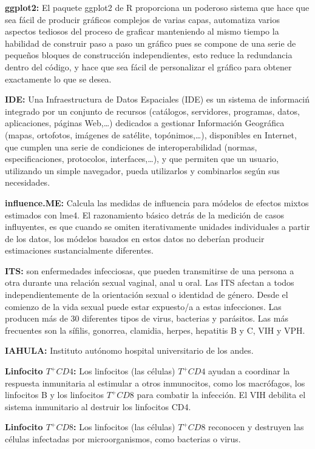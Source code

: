 \textbf{ggplot2:} El paquete ggplot2 de R proporciona un poderoso sistema que hace que sea f\'acil de producir gr\'aficos complejos de varias capas, automatiza varios aspectos tediosos del proceso de graficar manteniendo al mismo tiempo la habilidad de construir paso a paso un gr\'afico pues se compone de una serie de pequeños bloques de construcci\'on independientes, esto reduce la redundancia dentro del c\'odigo, y hace que sea f\'acil de personalizar el gr\'afico para obtener exactamente lo que se desea.

\textbf{IDE: } Una Infraestructura de Datos Espaciales (IDE) es un sistema de informaci\'n integrado por un conjunto de recursos (cat\'alogos, servidores, programas, datos, aplicaciones, p\'aginas Web,…) dedicados a gestionar Informaci\'on Geogr\'afica (mapas, ortofotos, im\'agenes de sat\'elite, top\'onimos,…), disponibles en Internet, que cumplen una serie de condiciones de interoperabilidad (normas, especificaciones, protocolos, interfaces,…), y que permiten que un usuario, utilizando un simple navegador, pueda utilizarlos y combinarlos seg\'un sus necesidades.

\textbf{influence.ME: } Calcula las medidas de influencia para m\'odelos de efectos mixtos estimados con lme4. El razonamiento b\'asico detr\'as de la medici\'on de casos influyentes, es que cuando se omiten iterativamente unidades individuales
a partir de los datos, los m\'odelos basados en estos datos no deber\'ian producir estimaciones sustancialmente diferentes. 

\textbf{ITS: } son enfermedades infecciosas, que pueden transmitirse de una persona a otra durante una relaci\'on sexual vaginal, anal u oral. Las ITS afectan a todos independientemente de la orientaci\'on sexual o identidad de g\'enero. Desde el comienzo de la vida sexual puede estar expuesto/a a estas infecciones. Las producen m\'as de 30 diferentes tipos de virus, bacterias y par\'asitos. Las m\'as frecuentes son la s\'ifilis, gonorrea, clamidia, herpes, hepatitis B y C, VIH y VPH.

\textbf{IAHULA: } Instituto aut\'onomo hospital universitario de los andes.

\textbf{Linfocito $T^{+}CD4$:} Los linfocitos (las c\'elulas) $T^{+}CD4$ ayudan a coordinar la respuesta inmunitaria al estimular a otros inmunocitos, como los macr\'ofagos, los linfocitos B y los linfocitos $T^{+}CD8$ para combatir la infecci\'on. El VIH debilita el sistema inmunitario al destruir los linfocitos CD4.

\textbf{Linfocito $T^{+}CD8$: } Los linfocitos (las c\'elulas) $T^{+}CD8$ reconocen y destruyen las c\'elulas infectadas por microorganismos, como bacterias o virus. 

